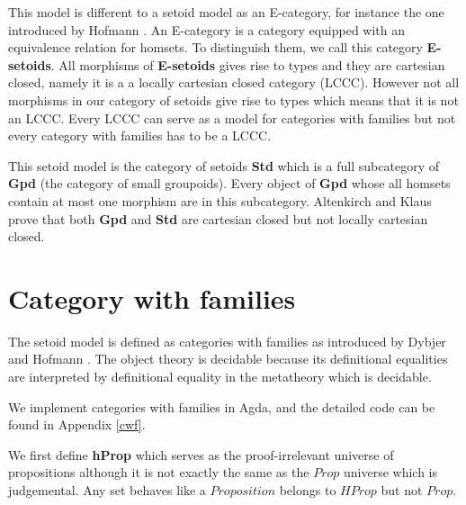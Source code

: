 \begin{remark}
This model is different to a setoid model as an E-category, for instance
the one introduced by Hofmann \cite{hofmann1995interpretation}. An E-category is a category equipped with
an equivalence relation for homsets. To distinguish them, we call this
category \textbf{E-setoids}.  All morphisms of \textbf{E-setoids}
gives rise to types and they are cartesian closed, namely it is a a locally
cartesian closed category (LCCC). However not all morphisms in our category of setoids give rise to types which means that it is not an LCCC. Every LCCC can serve as a model for categories with
families but not every category with families has to be a LCCC. 

This setoid model is the category of setoids \textbf{Std} which is a full subcategory of \textbf{Gpd} (the category of small groupoids). Every object of \textbf{Gpd} whose all homsets contain at most one morphism are in this subcategory. Altenkirch and Klaus \cite{Altenkirch12setoidsare} prove that both \textbf{Gpd} and \textbf{Std} are cartesian closed but not locally cartesian closed.
\end{remark}


\section{Category with families}


The setoid model is defined as categories with families as introduced by Dybjer \cite{Dyb:96} and Hofmann
\cite{hof:97}. The object theory is decidable because its definitional equalities are interpreted by definitional equality in the metatheory which is decidable.

We implement categories with families in Agda, and the detailed code can be found in Appendix \ref{cwf}.

We first define \textbf{hProp} which serves as the proof-irrelevant universe of propositions although it is not exactly the same as the $Prop$ universe which is judgemental. Any set behaves like a $Proposition$ belongs to $HProp$ but not $Prop$.


\begin{code}\>\<%
\\
\>  \AgdaSymbol{:}  \<%
\\
\>[0]\<[2]%
\\
\>[0]\<[2]%
\>[2]\<%
\\
\>[2]\<[4]%
\>[4] \AgdaSymbol{:} \<%
\\
\>[2]\<[4]%
\>[4] \AgdaSymbol{:} \AgdaSymbol{\{}  \AgdaSymbol{:} \AgdaSymbol{\}}    \<
%
\>\<\end{code}

